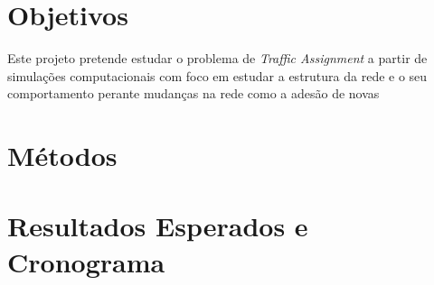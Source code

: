 \documentclass{article}
\begin{document}

\newpage
\section{Objetivos}

Este projeto pretende estudar o problema de \textit{Traffic Assignment} a partir de simulações computacionais com foco em estudar a estrutura da rede e o seu comportamento perante mudanças na rede como a adesão de novas 

\newpage

\section{Métodos}

\newpage

\section{Resultados Esperados e Cronograma}

\newpage


\end{document}
